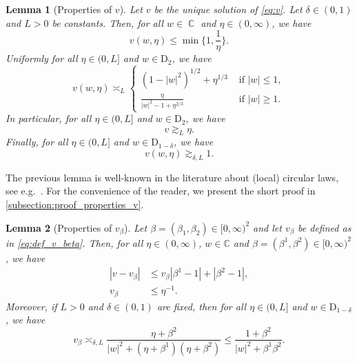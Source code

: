 \documentclass[11pt]{article}
\DeclareMathOperator{\CC}{\mathbb{C}}
\newcommand{\abs}[1]{\left| #1 \right|}
\newcommand{\C}{\mathbb{C}}
\theoremstyle{plain}
\newtheorem{lemma}{Lemma}[section]
\theoremstyle{remark}
\numberwithin{equation}{section}
\begin{document}
	
	\begin{lemma}[Properties of $v$]\label{lem:profv}
		Let $v$ be the unique solution of \cref{eq:v}. Let $\delta \in (0,1)$ and $L>0$ be constants.
		Then, for all $w\in \CC$ and $\eta \in (0 , \infty)$, we have
		\begin{equation}\label{eq:v_leq_1}
			v(w,\eta) \le \min \biggl\{1, \frac{1}{\eta}\biggr\}.  
		\end{equation}
		Uniformly for all $\eta \in (0,L]$ and $w \in \mathrm{D}_2$, we have 
		\begin{equation} \label{eq:v_full_scaling} 
			v(w,\eta) \asymp_L \begin{cases} (1 - \abs{w}^2)^{1/2} + \eta^{1/3} & \text{ if } \abs{w} \leq 1, \\ 
				\frac{\eta}{\abs{w}^2 - 1 + \eta^{2/3}} & \text{ if } \abs{w} \geq 1. \end{cases}
		\end{equation}
		In particular, for all $\eta \in (0, L]$ and $w \in \mathrm{D}_2$, we have
		\begin{equation}\label{eq:vgeeta}
			v \gtrsim_{L} \eta.
		\end{equation}
		Finally, for all $\eta \in (0,L]$ and $w \in \mathrm{D}_{1-\delta}$, we have 
		\begin{equation}\label{eq:v_asymp_1} 
			v(w,\eta) \gtrsim_{\delta,L} 1. 
		\end{equation}   
	\end{lemma} 
	
	
	The previous lemma is well-known in the literature about (local) circular laws,   see e.g.\ \cite{BYY2014,AEKinhomogeneous,HeDigraph}. 
	For the convenience of the reader, we present the short proof in \cref{subsection:proof_properties_v}. 


	
	
	
	\begin{lemma}[Properties of $v_\beta$] \label{lem:properties_v_beta} 
		Let $\beta = (\beta_1, \beta_2) \in [0,\infty)^2$ and let $v_\beta$ be defined as in \eqref{eq:def_v_beta}. 
		Then, for all $\eta \in (0, \infty)$, $w \in \C$ and $\beta=(\beta^1,\beta^2) \in [0,\infty)^2$, we have 
		\begin{align}\label{eq:lipschitz_v_beta}
			|v-v_{\beta}| & \leq v_\beta|\beta^{1} -1| + |\beta^{2} -1 |, \\ 
			v_\beta & \leq \eta^{-1}.  \label{eq:v_beta_leq_eta_inverse} 
		\end{align} 
		Moreover, if $L >0$ and $\delta \in (0,1)$ are fixed, then for all $\eta \in (0,L]$ and $w \in \mathrm{D}_{1-\delta}$, we have 
		\begin{equation}\label{eq:encadrementmi}
			v_\beta \asymp_{\delta,L} \frac{\eta + \beta^{2}}{\abs{w}^2 + (\eta + \beta^1)(\eta + \beta^{2})} \leq \frac{1 + \beta^{2}}{\abs{w}^2 + \beta^{1} \beta^{2}}  .  
		\end{equation}
		
	\end{lemma}
	
\end{document}
